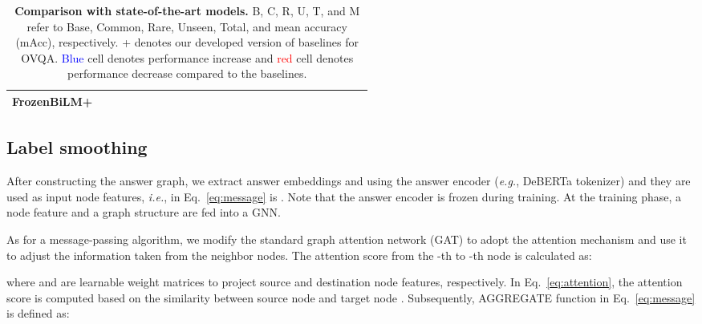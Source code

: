 \documentclass[10pt,twocolumn,letterpaper]{article}
\begin{document}
\begin{table*}[t!]
\begin{adjustbox}{width=\linewidth}
\begin{tabular}{c|c c c c c c | c c c c c c | c c c c c c | c c c c c c }
        \textbf{FrozenBiLM+}  & \cellcolor[HTML]{FFD7D1}{72.2} & \cellcolor[HTML]{FFD7D1}{48.2} & \textbf{\cellcolor[HTML]{BFF2FF}{21.6}} & \textbf{\cellcolor[HTML]{BFF2FF}{16.1}} & \textbf{\cellcolor[HTML]{BFF2FF}{55.8}} & \textbf{\cellcolor[HTML]{BFF2FF}{21.7}} & \textbf{\cellcolor[HTML]{BFF2FF}{68.8}} & \cellcolor[HTML]{FFD7D1}{39.9} & \textbf{\cellcolor[HTML]{BFF2FF}{17.3}} & \textbf{\cellcolor[HTML]{BFF2FF}{5.8}} & \textbf{\cellcolor[HTML]{BFF2FF}{44.8}} & \textbf{\cellcolor[HTML]{BFF2FF}{12.4}} & \cellcolor[HTML]{FFD7D1}{77.7} & \textbf{\cellcolor[HTML]{BFF2FF}{52.1}} & \textbf{\cellcolor[HTML]{BFF2FF}{28.6}} & \textbf{\cellcolor[HTML]{BFF2FF}{21.3}} & \cellcolor[HTML]{BFF2FF}{69.0} & \textbf{\cellcolor[HTML]{BFF2FF}{30.2}} & \cellcolor[HTML]{FFD7D1}{56.1} & \textbf{\cellcolor[HTML]{BFF2FF}{26.6}} & \textbf{\cellcolor[HTML]{BFF2FF}{11.7}} & \textbf{\cellcolor[HTML]{BFF2FF}{6.6}} & \textbf{\cellcolor[HTML]{BFF2FF}{47.0}} & \textbf{\cellcolor[HTML]{BFF2FF}{12.4}} \\ 
        \bottomrule
    \end{tabular}
    \end{adjustbox}
    \caption{\textbf{Comparison with state-of-the-art models.}
    B, C, R, U, T, and M refer to Base, Common, Rare, Unseen, Total, and mean accuracy (mAcc), respectively.
    + denotes our developed version of baselines for OVQA.
    \textcolor{blue}{Blue} cell denotes performance increase and \textcolor{red}{red} cell denotes performance decrease compared to the baselines.
    }
    \label{tab:main}
\end{table*}

 \subsection{Label smoothing}

After constructing the answer graph, we extract answer embeddings  and  using the answer encoder (\textit{e.g.}, DeBERTa tokenizer) and they are used as input node features, \textit{i.e.},  in Eq.~\eqref{eq:message} is .
Note that the answer encoder is frozen during training.
At the training phase, a node feature  and a graph structure  are fed into a GNN.

As for a message-passing algorithm, we modify the standard graph attention network (GAT) to adopt the attention mechanism and use it to adjust the information taken from the neighbor nodes.
The attention score from the -th to -th node is calculated as:

where  and  are learnable weight matrices to project source and destination node features, respectively.
In Eq.~\eqref{eq:attention}, the attention score  is computed based on the similarity between source node  and target node .
Subsequently, AGGREGATE function in Eq.~\eqref{eq:message} is defined as:
\end{document}

